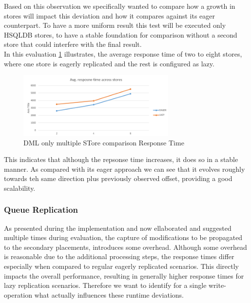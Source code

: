 Based on this observation we specifically wanted to compare how a growth in stores will impact this deviation and how it compares against its eager counterpart. 
To have a more uniform result this test will be executed only HSQLDB stores, to have a stable foundation for comparison
without a second store that could interfere with the final result.\\
In this evaluation \ref{fig:stores_comp} illustrates, the average response time of two to eight stores, where one store is eagerly replicated and the rest
is configured as lazy.


\begin{figure}[t] 
    \centering 
    \includegraphics[width=0.7\textwidth]{Figures/hsql_avg_response_stores.PNG}
    \caption{DML only multiple STore comparison  Response Time}
    \label{fig:stores_comp}
\end{figure}

This indicates that although the repsonse time increases, it does so in a stable manner. As compared with its eager approach we can see that it evolves roughly towards teh same direction plus
previously observed offset, providing a good scalability.

\subsubsection{Queue Replication}


As presented during the implementation and now ellaborated and suggested multiple times during evaluation, 
the capture of modifications to be propagated to the secondary placements, introduces some overhead. Although some overhead
is reasonable due to the additional processing steps, the response times differ 
especially when compared to regular eagerly replicated scenarios. This directly impacts the overall performance,
resulting in generally higher response times for lazy replication scenarios.
Therefore we want to identify for a single write-operation what actually influences these runtime deviations.


